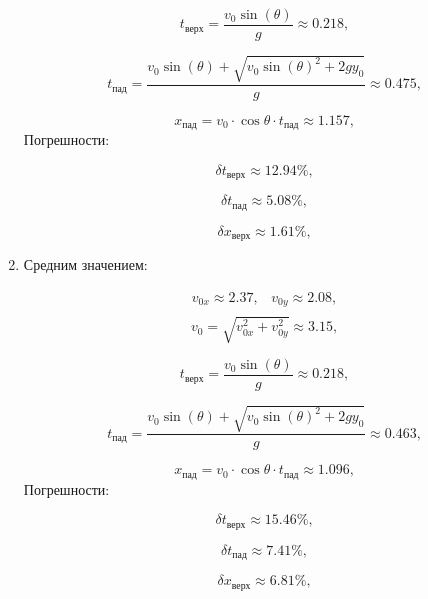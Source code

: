 \documentclass{report}
\begin{document}
\begin{enumerate}
\begin{equation}
  t_{\text{верх}} = \dfrac{v_0 \sin(\theta)}{g}\approx 0.218\text{,}
\end{equation}

\begin{equation}
  t_{\text{пад}} = \dfrac{v_0 \sin(\theta)+\sqrt{v_0 \sin(\theta)^2+2 g y_0}}{g} \approx 0.475\text{,}
\end{equation}

\begin{equation}
  x_{\text{пад}} = v_0\cdot\cos{\theta}\cdot t_{\text{пад}} \approx 1.157\text{,}
\end{equation}
Погрешности:

\begin{equation}
  \delta t_{\text{верх}}\approx 12.94\% \text{,}
\end{equation}

\begin{equation}
  \delta t_{\text{пад}} \approx 5.08\% \text{,}
\end{equation}

\begin{equation}
  \delta x_{\text{верх}} \approx 1.61\% \text{,}
\end{equation}


\item Средним значением:

\begin{equation}
\begin{aligned}
  v_{0x}\approx 2.37\text{,} \quad
  v_{0y} \approx 2.08\text{,}\\
\end{aligned}
\end{equation}
    \begin{equation}
  v_0 = \sqrt{v_{0x}^2 + v_{0y}^2} \approx 3.15\text{,}
    \end{equation}

\begin{equation}
  t_{\text{верх}} = \dfrac{v_0 \sin(\theta)}{g}\approx 0.218\text{,}
\end{equation}

\begin{equation}
  t_{\text{пад}} = \dfrac{v_0 \sin(\theta)+\sqrt{v_0 \sin(\theta)^2+2 g y_0}}{g} \approx 0.463\text{,}
\end{equation}

\begin{equation}
  x_{\text{пад}} = v_0\cdot\cos{\theta}\cdot t_{\text{пад}} \approx 1.096\text{,}
\end{equation}
Погрешности:

\begin{equation}
  \delta t_{\text{верх}}\approx 15.46\% \text{,}
\end{equation}

\begin{equation}
  \delta t_{\text{пад}} \approx 7.41\% \text{,}
\end{equation}

\begin{equation}
  \delta x_{\text{верх}} \approx 6.81\% \text{,}
\end{equation}


\end{enumerate}
\end{document}
